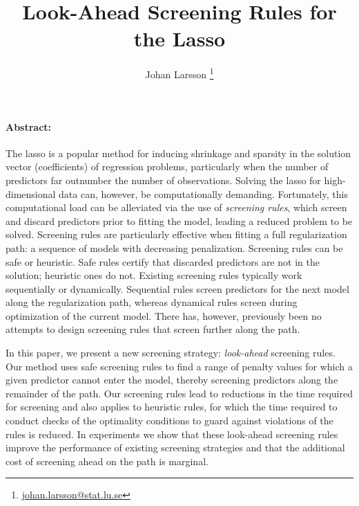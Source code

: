 \documentclass[b5paper,10pt,abstractoff,DIV=calc,headings=normal,twoside]{scrartcl}
\makeatletter
\newcommand{\shortauthor}{}
\newcommand{\shorttitle}{\@title}
\theoremstyle{plain}
\theoremstyle{definition}
\theoremstyle{remark}
\renewenvironment{abstract}{\bigskip\noindent\begin{minipage}{\textwidth}\setlength{\parindent}{15pt}\paragraph{Abstract:}}{\end{minipage}}
\makeatother
\begin{document}

\renewcommand{\shortauthor}{J. Larsson}
\renewcommand{\shorttitle}{Look-Ahead Screening Rules for the Lasso}

\title{Look-Ahead Screening Rules for the Lasso}

\author[1]{Johan Larsson%
  \thanks{%
    \href{mailto:johan.larsson@stat.lu.se}{\url{johan.larsson@stat.lu.se}}
  }%
}

\maketitle

\begin{abstract}
  The lasso is a popular method for inducing shrinkage and sparsity in the
  solution vector (coefficients) of regression problems, particularly when
  the number of predictors far outnumber the number of observations. Solving
  the lasso for high-dimensional data can, however, be computationally
  demanding. Fortunately, this computational load can be alleviated via the
  use of \emph{screening rules}, which screen and discard predictors prior to
  fitting the model, leading a reduced problem to be solved. Screening rules
  are particularly effective when fitting a full regularization path: a
  sequence of models with decreasing penalization. Screening rules can be
  safe or heuristic. Safe rules certify that discarded predictors are not in
  the solution; heuristic ones do not. Existing screening rules typically
  work sequentially or dynamically. Sequential rules screen predictors for
  the next model along the regularization path, whereas dynamical rules
  screen during optimization of the current model. There has, however,
  previously been no attempts to design screening rules that screen further
  along the path.

  In this paper, we present a new screening strategy: \emph{look-ahead}
  screening rules. Our method uses safe screening rules to find a range of
  penalty values for which a given predictor cannot enter the model, thereby
  screening predictors along the remainder of the path. Our screening rules
  lead to reductions in the time required for screening and also applies to
  heuristic rules, for which the time required to conduct checks of the
  optimality conditions to guard against violations of the rules is reduced.
  In experiments we show that these look-ahead screening rules improve the
  performance of existing screening strategies and that the additional cost
  of screening ahead on the path is marginal.
\end{abstract}
\end{document}
